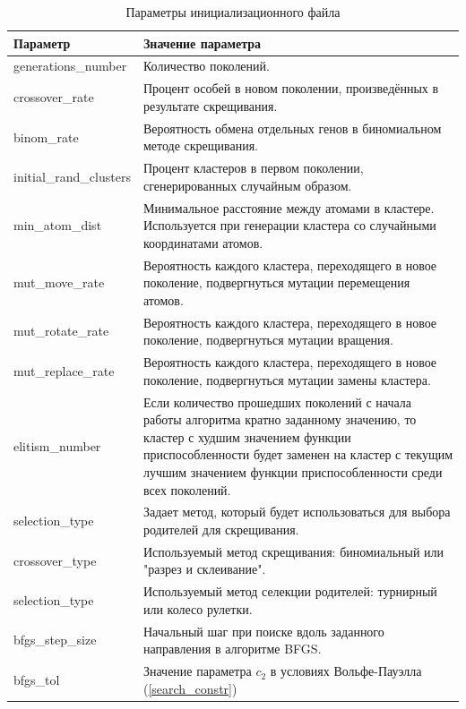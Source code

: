 \begin{table}[H]
\begin{center}
\begin{tabular}{|p{0.25\linewidth}|p{0.75\linewidth}|}
  \hline
  \textbf{Параметр}       &    \textbf{Значение параметра} \\
  \hline
  generations\_number     &    Количество поколений. \\
  \hline
  crossover\_rate         &    Процент особей в новом поколении, произведённых в
                               результате скрещивания. \\
  \hline
  binom\_rate             &    Вероятность обмена отдельных генов в биномиальном методе скрещивания. \\
  \hline
  initial\_rand\_clusters &  Процент кластеров в первом поколении, сгенерированных
                               случайным образом. \\
  \hline
  min\_atom\_dist         &  Минимальное расстояние между атомами в кластере.
                             Используется при генерации кластера со случайными координатами атомов. \\
  \hline
  mut\_move\_rate         &  Вероятность каждого кластера, переходящего в новое поколение, подвергнуться
                             мутации перемещения атомов. \\
  \hline
  mut\_rotate\_rate       &  Вероятность каждого кластера, переходящего в новое поколение, подвергнуться
                             мутации вращения. \\
  \hline
  mut\_replace\_rate      &  Вероятность каждого кластера, переходящего в новое поколение, подвергнуться
                             мутации замены кластера. \\
  \hline
  elitism\_number         &  Если количество прошедших поколений с начала работы алгоритма кратно заданному
                             значению, то кластер с худшим значением функции приспособленности будет заменен
                             на кластер с текущим лучшим значением функции приспособленности среди всех
                             поколений. \\
  \hline
  selection\_type         &  Задает метод, который будет использоваться для выбора родителей для скрещивания. \\
  \hline
  crossover\_type         &  Используемый метод скрещивания: биномиальный или "разрез и склеивание". \\
  \hline
  selection\_type         &  Используемый метод селекции родителей: турнирный или колесо рулетки. \\
  \hline
  bfgs\_step\_size        &  Начальный шаг при поиске вдоль заданного направления в алгоритме BFGS. \\
  \hline
  bfgs\_tol               &  Значение параметра $c_2$ в условиях Вольфе-Пауэлла (\ref{search_constr}) \\
  \hline
\end{tabular}
\caption{Параметры инициализационного файла}
\label{table:iniparams}
\end{center}
\end{table}
